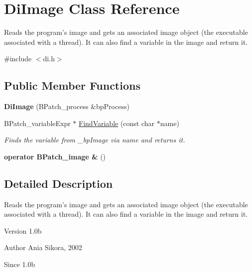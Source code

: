 \hypertarget{class_di_image}{\section{Di\-Image Class Reference}
\label{class_di_image}
}


Reads the program's image and gets an associated image object (the executable associated with a thread). It can also find a variable in the image and return it.  




{\ttfamily \#include $<$di.\-h$>$}

\subsection*{Public Member Functions}
\begin{DoxyCompactItemize}
\item 
\hypertarget{class_di_image_afd1a854b23db70ddf7f25c82e60102a2}{{\bfseries Di\-Image} (B\-Patch\-\_\-process \&bp\-Process)}\label{class_di_image_afd1a854b23db70ddf7f25c82e60102a2}

\item 
B\-Patch\-\_\-variable\-Expr $\ast$ \hyperlink{class_di_image_a1442d33b97ad72a1ddd6aa4a7e9db916}{Find\-Variable} (const char $\ast$name)
\begin{DoxyCompactList}\small\item\em Finds the variable from \-\_\-bp\-Image via name and returns it. \end{DoxyCompactList}\item 
\hypertarget{class_di_image_a2dd2df8fbb5a872bb79132d57df858ef}{{\bfseries operator B\-Patch\-\_\-image \&} ()}\label{class_di_image_a2dd2df8fbb5a872bb79132d57df858ef}

\end{DoxyCompactItemize}


\subsection{Detailed Description}
Reads the program's image and gets an associated image object (the executable associated with a thread). It can also find a variable in the image and return it. 

\begin{DoxyVersion}{Version}
1.\-0b 
\end{DoxyVersion}
\begin{DoxyAuthor}{Author}
Ania Sikora, 2002 
\end{DoxyAuthor}
\begin{DoxySince}{Since}
1.\-0b 
\end{DoxySince}



